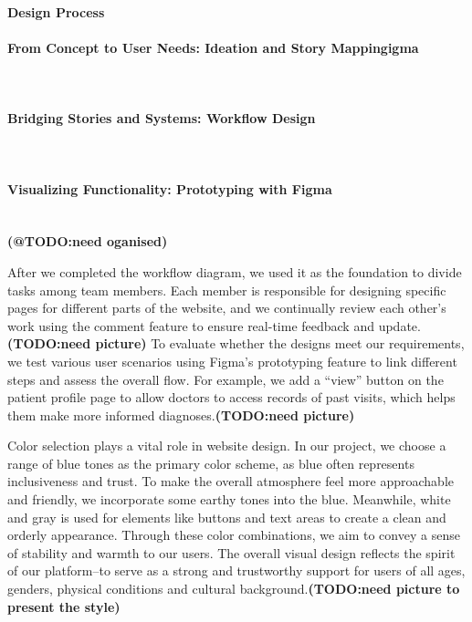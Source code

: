 %
%

\paragraph{Design Process}\mbox{}
\paragraph{From Concept to User Needs: Ideation and Story Mappingigma}\mbox{}\\

\paragraph{Bridging Stories and Systems: Workflow Design}\mbox{}\\

\paragraph{Visualizing Functionality: Prototyping with Figma}\mbox{}\\
\textbf{(@TODO:need oganised)}

After we completed the workflow diagram, we used it as the foundation to divide tasks among team members. Each member is responsible for designing specific pages for different parts of the website, and we continually review each other’s work using the comment feature to ensure real-time feedback and update.\textbf{(TODO:need picture)} To evaluate whether the designs meet our requirements, we test various user scenarios using Figma’s prototyping feature to link different steps and assess the overall flow. For example, we add a “view” button on the patient profile page to allow doctors to access records of past visits, which helps them make more informed diagnoses.\textbf{(TODO:need picture)}

Color selection plays a vital role in website design. In our project, we choose a range of blue tones as the primary color scheme, as blue often represents inclusiveness and trust. To make the overall atmosphere feel more approachable and friendly, we incorporate some earthy tones into the blue. Meanwhile, white and gray is used for elements like buttons and text areas to create a clean and orderly appearance. Through these color combinations, we aim to convey a sense of stability and warmth to our users. The overall visual design reflects the spirit of our platform–to serve as a strong and trustworthy support for users of all ages, genders, physical conditions and cultural background.\textbf{(TODO:need picture to present the style)}

